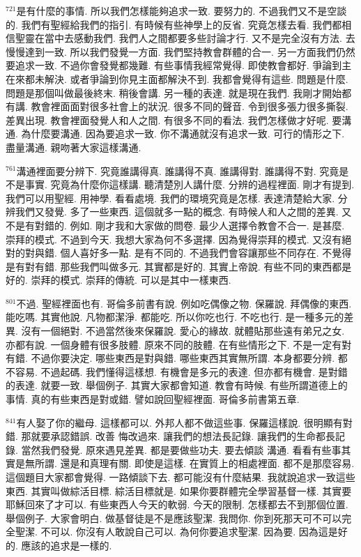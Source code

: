 \documentclass{book}
\begin{document}
$^{721}$是有什麼的事情.
所以我們怎樣能夠追求一致.
要努力的.
不過我們又不是空談的.
我們有聖經給我們的指引.
有時候有些神學上的反省.
究竟怎樣去看.
我們都相信聖靈在當中去感動我們.
我們人之間都要多些討論才行.
又不是完全沒有方法.
去慢慢達到一致.
所以我們發覺一方面.
我們堅持教會群體的合一.
另一方面我們仍然要追求一致.
不過你會發覺都幾難.
有些事情我經常覺得.
即使教會都好.
爭論到主在來都未解決.
或者爭論到你見主面都解決不到.
我都會覺得有這些.
問題是什麼.
問題是那個叫做最後終末.
稍後會講.
另一種的表達.
就是現在我們.
我剛才開始都有講.
教會裡面面對很多社會上的狀況.
很多不同的聲音.
令到很多張力很多撕裂.
差異出現.
教會裡面發覺人和人之間.
有很多不同的看法.
我們怎樣做才好呢.
要溝通.
為什麼要溝通.
因為要追求一致.
你不溝通就沒有追求一致.
可行的情形之下.
盡量溝通.
親吻著大家這樣溝通.

$^{761}$溝通裡面要分辨下.
究竟誰講得真.
誰講得不真.
誰講得對.
誰講得不對.
究竟是不是事實.
究竟為什麼你這樣講.
聽清楚別人講什麼.
分辨的過程裡面.
剛才有提到.
我們可以用聖經.
用神學.
看看處境.
我們的環境究竟是怎樣.
表達清楚給大家.
分辨我們又發覺.
多了一些東西.
這個就多一點的概念.
有時候人和人之間的差異.
又不是有對錯的.
例如.
剛才我和大家做的問卷.
最少人選擇令教會不合一.
是甚麼.
崇拜的模式.
不過到今天.
我想大家為何不多選擇.
因為覺得崇拜的模式.
又沒有絕對的對與錯.
個人喜好多一點.
是有不同的.
不過我們會容讓那些不同存在.
不覺得是有對有錯.
那些我們叫做多元.
其實都是好的.
其實上帝說.
有些不同的東西都是好的.
崇拜的模式.
崇拜的傳統.
可以是其中一樣東西.

$^{801}$不過.
聖經裡面也有.
哥倫多前書有說.
例如吃偶像之物.
保羅說.
拜偶像的東西.
能吃嗎.
其實他說.
凡物都潔淨.
都能吃.
所以你吃也行.
不吃也行.
是一種多元的差異.
沒有一個絕對.
不過當然後來保羅說.
愛心的緣故.
就體貼那些遠有弟兄之女.
亦都有說.
一個身體有很多肢體.
原來不同的肢體.
在有些情形之下.
不是一定有對有錯.
不過你要決定.
哪些東西是對與錯.
哪些東西其實無所謂.
本身都要分辨.
都不容易.
不過起碼.
我們懂得這樣想.
有機會是多元的表達.
但亦都有機會.
是對錯的表達.
就要一致.
舉個例子.
其實大家都會知道.
教會有時候.
有些所謂道德上的事情.
真的有些東西是對或錯.
譬如說回聖經裡面.
哥倫多前書第五章.

$^{841}$有人娶了你的繼母.
這樣都可以.
外邦人都不做這些事.
保羅這樣說.
很明顯有對錯.
那就要承認錯誤.
改善 悔改過來.
讓我們的想法長記錄.
讓我們的生命都長記錄.
當然我們發覺.
原來遇見差異.
都是要做些功夫.
要去傾談 溝通.
看看有些事其實是無所謂.
還是和真理有關.
即使是這樣.
在實質上的相處裡面.
都不是那麼容易.
這個題目大家都會覺得.
一路傾談下去.
都可能沒有什麼結果.
我就說追求一致這些東西.
其實叫做綜活目標.
綜活目標就是.
如果你要群體完全學習基督一樣.
其實要耶穌回來了才可以.
有些東西人今天的軟弱.
今天的限制.
怎樣都去不到那個位置.
舉個例子.
大家會明白.
做基督徒是不是應該聖潔.
我問你.
你到死那天可不可以完全聖潔.
不可以.
你沒有人敢說自己可以.
為何你要追求聖潔.
因為要.
因為這是好的.
應該的追求是一樣的.
\end{document}
